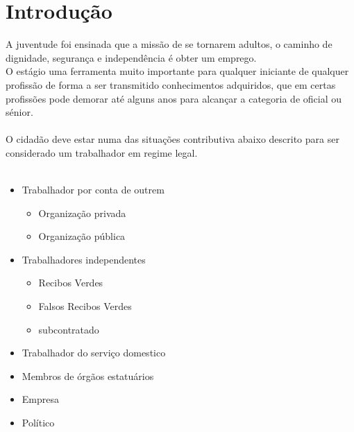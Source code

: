 \section{Introdução}
\qquad A juventude foi ensinada que a missão de se tornarem adultos, o caminho de dignidade, segurança e independência é obter um emprego.\cite{book_11}\\
O estágio uma ferramenta muito importante para qualquer iniciante de qualquer profissão de forma a ser transmitido conhecimentos adquiridos, que em certas profissões pode demorar até alguns anos para alcançar a categoria de oficial ou sénior.\\
\\
O cidadão deve estar numa das situações contributiva abaixo descrito para ser considerado um trabalhador em regime legal.\\
\\
\begin{minipage}[t]{\linewidth}
\begin{itemize}
\setlength\itemsep{-0.3em}
\item Trabalhador por conta de outrem
\begin{itemize}
\item Organização privada
\item Organização pública
\end{itemize}
\item Trabalhadores independentes
\begin{itemize}
\item Recibos Verdes
\item Falsos Recibos Verdes
\item subcontratado
\end{itemize}
\newpage
\item Trabalhador do serviço domestico
\item Membros de órgãos estatuários
\item Empresa
\item Político\\ \\
\end{itemize}
\end{minipage}
